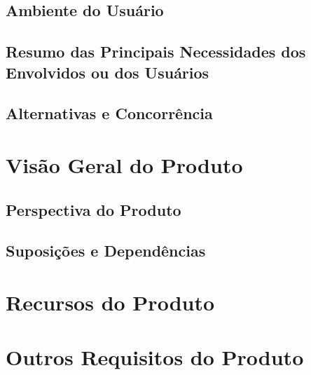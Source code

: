     \subsection{Ambiente do Usuário}
    \subsection{Resumo das Principais Necessidades dos Envolvidos ou dos Usuários}
    \subsection{Alternativas e Concorrência}
    \section{Visão Geral do Produto}
    \subsection{Perspectiva do Produto}
    \subsection{Suposições e Dependências}
  \section{Recursos do Produto}
  \section{Outros Requisitos do Produto}
